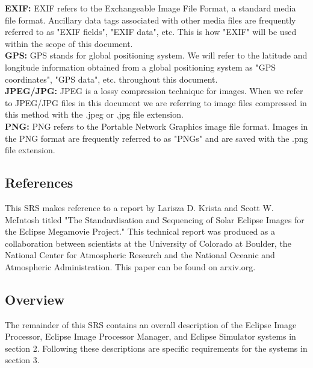 \documentclass[10pt, onecolumn, draftclsnofoot, letterpaper, compsoc]{IEEEtran}
\begin{document}
	\noindent \textbf{EXIF:}
	EXIF refers to the Exchangeable Image File Format, a standard 
	media file format. Ancillary data tags associated with other media 
	files are frequently referred to as "EXIF fields", "EXIF data", etc.
	This is how "EXIF" will be used within the scope of this document. \\

	\noindent \textbf{GPS:}
	GPS stands for global positioning system. We will refer to the
	latitude and longitude information obtained from a global positioning 
	system as "GPS coordinates", "GPS data", etc. throughout this document. \\

	\noindent \textbf{JPEG/JPG:}
	JPEG is a lossy compression technique for images. When we refer
	to JPEG/JPG files in this document we are referring to image files 
	compressed in this method with the .jpeg or .jpg file extension. \\

	\noindent \textbf{PNG:}
	PNG refers to the Portable Network Graphics image file format. 
	Images in the PNG format are frequently referred to as "PNGs" and are 
	saved with the .png file extension. 


\subsection{References}

This SRS makes reference to a report by Larisza D. Krista and Scott W.  
McIntosh titled "The Standardisation and Sequencing of Solar Eclipse Images for 
the Eclipse Megamovie Project." This technical report was produced as a 
collaboration between scientists at the University of Colorado at Boulder, the
National Center for Atmospheric Research and the National Oceanic and 
Atmospheric Administration. This paper can be found on arxiv.org.

\subsection{Overview}

The remainder of this SRS contains an overall description of the Eclipse Image
Processor, Eclipse Image Processor Manager, and Eclipse Simulator systems in 
section 2. Following these descriptions are specific requirements for the 
systems in section 3.

\newpage
\end{document}
